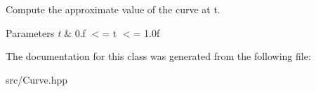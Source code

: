 Compute the approximate value of the curve at t. 


\begin{DoxyParams}{Parameters}
{\em t} & 0.\+f $<$= t $<$= 1.\+0f \\
\hline
\end{DoxyParams}


The documentation for this class was generated from the following file\+:\begin{DoxyCompactItemize}
\item 
src/Curve.\+hpp\end{DoxyCompactItemize}
